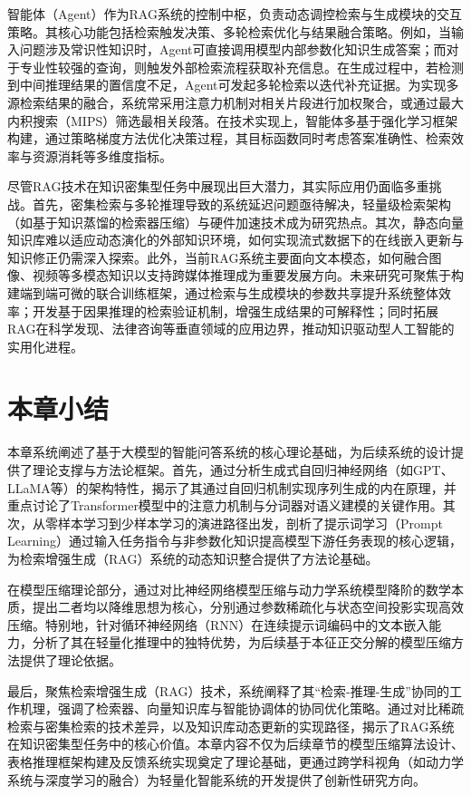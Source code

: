 智能体（Agent）作为RAG系统的控制中枢，负责动态调控检索与生成模块的交互策略。其核心功能包括检索触发决策、多轮检索优化与结果融合策略。例如，当输入问题涉及常识性知识时，Agent可直接调用模型内部参数化知识生成答案；而对于专业性较强的查询，则触发外部检索流程获取补充信息。在生成过程中，若检测到中间推理结果的置信度不足，Agent可发起多轮检索以迭代补充证据。为实现多源检索结果的融合，系统常采用注意力机制对相关片段进行加权聚合，或通过最大内积搜索（MIPS）筛选最相关段落。在技术实现上，智能体多基于强化学习框架构建，通过策略梯度方法优化决策过程，其目标函数同时考虑答案准确性、检索效率与资源消耗等多维度指标。

尽管RAG技术在知识密集型任务中展现出巨大潜力，其实际应用仍面临多重挑战。首先，密集检索与多轮推理导致的系统延迟问题亟待解决，轻量级检索架构（如基于知识蒸馏的检索器压缩）与硬件加速技术成为研究热点。其次，静态向量知识库难以适应动态演化的外部知识环境，如何实现流式数据下的在线嵌入更新与知识修正仍需深入探索。此外，当前RAG系统主要面向文本模态，如何融合图像、视频等多模态知识以支持跨媒体推理成为重要发展方向。未来研究可聚焦于构建端到端可微的联合训练框架，通过检索与生成模块的参数共享提升系统整体效率；开发基于因果推理的检索验证机制，增强生成结果的可解释性；同时拓展RAG在科学发现、法律咨询等垂直领域的应用边界，推动知识驱动型人工智能的实用化进程。
\section{本章小结}
本章系统阐述了基于大模型的智能问答系统的核心理论基础，为后续系统的设计提供了理论支撑与方法论框架。首先，通过分析生成式自回归神经网络（如GPT、LLaMA等）的架构特性，揭示了其通过自回归机制实现序列生成的内在原理，并重点讨论了Transformer模型中的注意力机制与分词器对语义建模的关键作用。其次，从零样本学习到少样本学习的演进路径出发，剖析了提示词学习（Prompt Learning）通过输入任务指令与非参数化知识提高模型下游任务表现的核心逻辑，为检索增强生成（RAG）系统的动态知识整合提供了方法论基础。

在模型压缩理论部分，通过对比神经网络模型压缩与动力学系统模型降阶的数学本质，提出二者均以降维思想为核心，分别通过参数稀疏化与状态空间投影实现高效压缩。特别地，针对循环神经网络（RNN）在连续提示词编码中的文本嵌入能力，分析了其在轻量化推理中的独特优势，为后续基于本征正交分解的模型压缩方法提供了理论依据。  

最后，聚焦检索增强生成（RAG）技术，系统阐释了其“检索-推理-生成”协同的工作机理，强调了检索器、向量知识库与智能协调体的协同优化策略。通过对比稀疏检索与密集检索的技术差异，以及知识库动态更新的实现路径，揭示了RAG系统在知识密集型任务中的核心价值。本章内容不仅为后续章节的模型压缩算法设计、表格推理框架构建及反馈系统实现奠定了理论基础，更通过跨学科视角（如动力学系统与深度学习的融合）为轻量化智能系统的开发提供了创新性研究方向。


